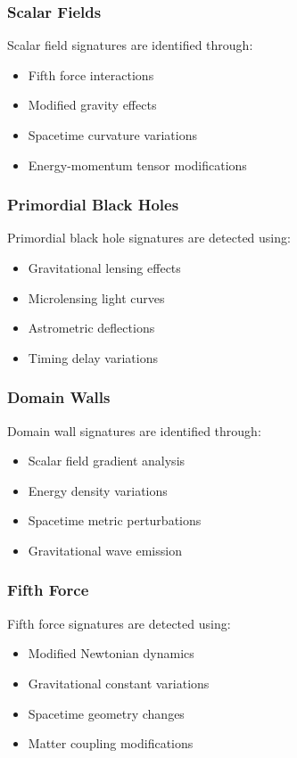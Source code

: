 \subsubsection{Scalar Fields}
Scalar field signatures are identified through:
\begin{itemize}
    \item Fifth force interactions
    \item Modified gravity effects
    \item Spacetime curvature variations
    \item Energy-momentum tensor modifications
\end{itemize}

\subsubsection{Primordial Black Holes}
Primordial black hole signatures are detected using:
\begin{itemize}
    \item Gravitational lensing effects
    \item Microlensing light curves
    \item Astrometric deflections
    \item Timing delay variations
\end{itemize}

\subsubsection{Domain Walls}
Domain wall signatures are identified through:
\begin{itemize}
    \item Scalar field gradient analysis
    \item Energy density variations
    \item Spacetime metric perturbations
    \item Gravitational wave emission
\end{itemize}

\subsubsection{Fifth Force}
Fifth force signatures are detected using:
\begin{itemize}
    \item Modified Newtonian dynamics
    \item Gravitational constant variations
    \item Spacetime geometry changes
    \item Matter coupling modifications
\end{itemize}

